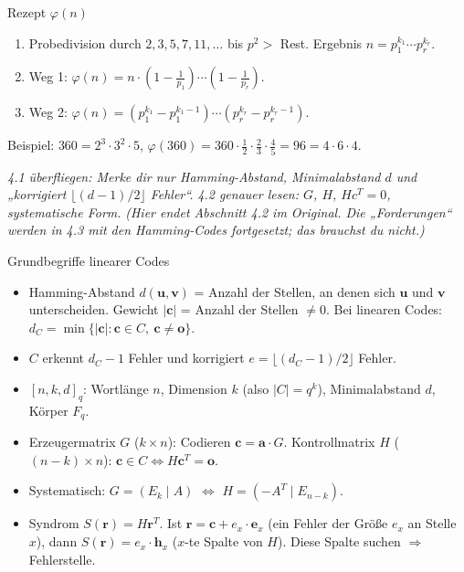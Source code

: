 \aufschreiben
\begin{rezept}{Rezept $\varphi(n)$}
\begin{enumerate}
\item Probedivision durch $2, 3, 5, 7, 11, \dots$ bis $p^2 > $ Rest. Ergebnis $n = p_1^{k_1} \cdots p_r^{k_r}$.
\item Weg 1: $\varphi(n) = n \cdot (1 - \frac{1}{p_1}) \cdots (1 - \frac{1}{p_r})$.
\item Weg 2: $\varphi(n) = (p_1^{k_1} - p_1^{k_1 - 1}) \cdots (p_r^{k_r} - p_r^{k_r - 1})$.
\end{enumerate}
Beispiel: $360 = 2^3 \cdot 3^2 \cdot 5$, $\varphi(360) = 360 \cdot \frac12 \cdot \frac23 \cdot \frac45 = 96 = 4 \cdot 6 \cdot 4$.
\end{rezept}

\ueben
{}

\loesungen
{}

\lesen
\textit{4.1 überfliegen: Merke dir nur Hamming-Abstand, Minimalabstand $d$ und „korrigiert $\lfloor (d-1)/2 \rfloor$ Fehler“.}
\textit{4.2 genauer lesen: $G$, $H$, $H c^T = 0$, systematische Form.}
\textit{(Hier endet Abschnitt 4.2 im Original. Die „Forderungen“ werden in 4.3 mit den Hamming-Codes fortgesetzt; das brauchst du nicht.)}

\aufschreiben
\begin{rezept}{Grundbegriffe linearer Codes}
\begin{itemize}
\item Hamming-Abstand $d(\mathbf{u}, \mathbf{v})$ = Anzahl der Stellen, an denen sich $\mathbf{u}$ und $\mathbf{v}$ unterscheiden.
      Gewicht $|\mathbf{c}|$ = Anzahl der Stellen $\neq 0$. Bei linearen Codes: $d_C = \min\{|\mathbf{c}| : \mathbf{c} \in C,\ \mathbf{c} \neq \mathbf{o}\}$.
\item $C$ erkennt $d_C - 1$ Fehler und korrigiert $e = \lfloor (d_C - 1)/2 \rfloor$ Fehler.
\item $[n, k, d]_q$: Wortlänge $n$, Dimension $k$ (also $|C| = q^k$), Minimalabstand $d$, Körper $F_q$.
\item Erzeugermatrix $G$ ($k \times n$): Codieren $\mathbf{c} = \mathbf{a} \cdot G$.
      Kontrollmatrix $H$ ($(n-k) \times n$): $\mathbf{c} \in C \Leftrightarrow H \mathbf{c}^T = \mathbf{o}$.
\item Systematisch: $G = (E_k \mid A)$ $\Leftrightarrow$ $H = (-A^T \mid E_{n-k})$.
\item Syndrom $S(\mathbf{r}) = H \mathbf{r}^T$. Ist $\mathbf{r} = \mathbf{c} + e_x \cdot \mathbf{e}_x$ (ein Fehler der Größe $e_x$ an Stelle $x$),
      dann $S(\mathbf{r}) = e_x \cdot \mathbf{h}_x$ ($x$-te Spalte von $H$). Diese Spalte suchen $\Rightarrow$ Fehlerstelle.
\end{itemize}
\end{rezept}

